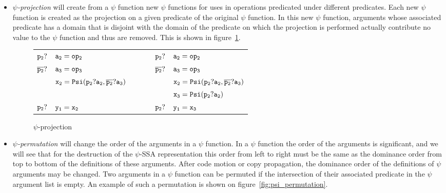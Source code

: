 \begin{itemize}
\item{\emph{$\psi$-projection}} will create from a $\psi$ function new
  $\psi$ functions for uses in operations predicated under different
  predicates. Each new $\psi$ function is created as the projection on
  a given predicate of the original $\psi$ function. In this new
  $\psi$ function, arguments whose associated predicate has a domain
  that is disjoint with the domain of the predicate on which the
  projection is performed actually contribute no value to the $\psi$
  function and thus are removed. This is shown in
  figure~\ref{fig:psi_projection}.

\begin{figure}
\begin{center}
\footnotesize
\begin{tabular}{lllll}
${\tt p_2?}$ & ${\tt a_2 = op_2}$             & \ \ \ \  & ${\tt p_2?}$ & ${\tt a_2 = op_2}$ \\
${\tt \overline{p_2}?}$ & ${\tt a_3 = op_3}$              & \ \ \ \  & ${\tt \overline{p_2}?}$ & ${\tt a_3 = op_3}$ \\
             & ${\tt x_2 = Psi(p_2?a_2, \overline{p_2}?a_3)}$ & \ \ \ \  &              &${\tt x_2 = Psi(p_2?a_2, \overline{p_2}?a_3)}$ \\
             &                               & \ \ \ \  &              & ${\tt x_3 = Psi(p_2?a_2)}$ \\
${\tt p_2?}$ & ${\tt y_1 = x_2}$              & \ \ \ \  & ${\tt p_2?}$ & ${\tt y_1 = x_3}$ \\
\end{tabular}
\caption{$\psi$-projection}
\label{fig:psi_projection}
\end{center}
\end{figure}

\item{\emph{$\psi$-permutation}} will change the order of the
  arguments in a $\psi$ function. In a $\psi$ function the order of
  the arguments is significant, and we will see that for the
  destruction of the $\psi$-SSA representation this order from left to
  right must be the same as the dominance order from top to bottom of
  the definitions of these arguments. After code motion or copy
  propagation, the dominance order of the definitions of $\psi$
  arguments may be changed. Two arguments in a $\psi$ function can be
  permuted if the intersection of their associated predicate in the
  $\psi$ argument list is empty. An example of such a permutation is
  shown on figure~\ref{fig:psi_permutation}.


\end{itemize}
